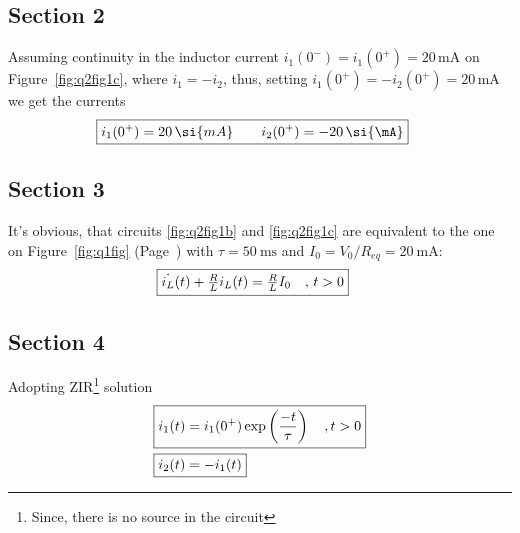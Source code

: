 \documentclass[12pt,a4paper,titlepage]{article}
\makeatletter
\let\reftagform@=\tagform@
\def\tagform@#1{\maketag@@@{(\ignorespaces\textcolor{red}{#1}\unskip\@@italiccorr)}}
\renewcommand{\eqref}[1]{\textup{\reftagform@{\ref{#1}}}}
\makeatother
\begin{document}
{\subsection{Section 2}{
Assuming continuity in the inductor current $i_1(0^-)=i_1(0^+)=20\,\si{\mA}$ on Figure~\ref{fig:q2fig1c}, where $i_1=-i_2$, thus, setting $i_1(0^+)=-i_2(0^+)=20\,\si{\mA}$ we get the currents
\begin{align*}
\Aboxed{i_1(0^+)=20\,\si{mA} \qquad i_2(0^+)=-20\,\si{\mA}}
\end{align*}
}
\subsection{Section 3}{It's obvious, that circuits \ref{fig:q2fig1b} and \ref{fig:q2fig1c} are equivalent to the one on Figure~\ref{fig:q1fig} (Page~\pageref{fig:q1fig}) with $\tau=50~\si{\ms}$ and $I_0=V_0/R_{eq}=20~\si{\mA}$:
\begin{align}
\Aboxed{\dot{i_L}(t)+\tfrac{R}{L}i_L(t)&=\tfrac{R}{L}I_0 \quad,\, t>0}
\end{align}
}
\subsection{Section 4}{Adopting ZIR\footnote{Since, there is no source in the circuit} solution~\eqref{eq:7} 
\begin{align*}
\Aboxed{i_1(t)&=i_1(0^+)\exp\left({\dfrac{-t}{\tau}}\right) \quad, t>0} \\
\Aboxed{i_2(t)&=-i_1(t)}
\end{align*}
}
}\label{sec:q2sec}
\end{document}

